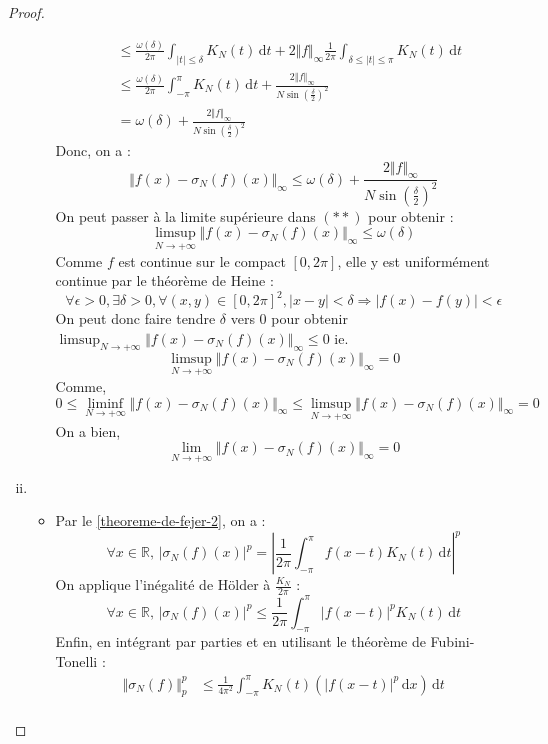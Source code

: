 \begin{proof}
\begin{enumerate}[(i)]
\begin{itemize}
\begin{align*}
					&\leq \frac{\omega(\delta)}{2\pi} \int_{\vert t \vert \leq \delta} K_N(t) \, \mathrm{d}t + 2 \Vert f \Vert_\infty \frac{1}{2\pi} \int_{\delta \leq \vert t \vert \leq \pi} K_N(t) \, \mathrm{d}t \\
					&\leq \frac{\omega(\delta)}{2\pi} \int_{-\pi}^{\pi} K_N(t) \, \mathrm{d}t + \frac{2 \Vert f \Vert_\infty}{N \sin \left(\frac{\delta}{2} \right)^2} \\
					&= \omega(\delta) + \frac{2 \Vert f \Vert_\infty}{N \sin \left(\frac{\delta}{2} \right)^2}
				\end{align*}
				Donc, on a :
				\[ \Vert f(x) - \sigma_N(f)(x) \Vert_\infty \leq \omega(\delta) + \frac{2 \Vert f \Vert_\infty}{N \sin \left(\frac{\delta}{2} \right)^2} \tag{**} \]
				On peut passer à la limite supérieure dans $(**)$ pour obtenir :
				\[ \limsup_{N \rightarrow +\infty} \Vert f(x) - \sigma_N(f)(x) \Vert_\infty \leq \omega(\delta) \]
				Comme $f$ est continue sur le compact $[0,2\pi]$, elle y est uniformément continue par le théorème de Heine :
				\[ \forall \epsilon>0, \exists \delta>0, \forall(x,y)\in[0,2\pi]^2, |x-y|<\delta\Rightarrow |f(x)-f(y)|<\epsilon \]
				On peut donc faire tendre $\delta$ vers $0$ pour obtenir $\limsup_{N \rightarrow +\infty} \Vert f(x) - \sigma_N(f)(x) \Vert_\infty \leq 0$
				ie.
				\[ \limsup_{N \rightarrow +\infty} \Vert f(x) - \sigma_N(f)(x) \Vert_\infty = 0 \]
				Comme,
				\[ 0 \leq \liminf_{N \rightarrow +\infty} \Vert f(x) - \sigma_N(f)(x) \Vert_\infty \leq \limsup_{N \rightarrow +\infty} \Vert f(x) - \sigma_N(f)(x) \Vert_\infty = 0 \]
				On a bien,
				\[ \lim_{N \rightarrow +\infty} \Vert f(x) - \sigma_N(f)(x) \Vert_\infty = 0 \]
			\end{itemize}
			\item \begin{itemize}
				\item Par le \cref{theoreme-de-fejer-2}, on a :
				\[ \forall x \in \mathbb{R}, \, \vert \sigma_N(f)(x) \vert^p = \left \vert \frac{1}{2\pi} \int_{-\pi}^{\pi} f(x-t) K_N(t) \, \mathrm{d}t \right \vert^p \]
				On applique l'inégalité de Hölder à $\frac{K_N}{2\pi}$ :
				\[ \forall x \in \mathbb{R}, \, \vert \sigma_N(f)(x) \vert^p \leq \frac{1}{2\pi} \int_{-\pi}^{\pi} \vert f(x-t) \vert^p K_N(t) \, \mathrm{d}t \]
				Enfin, en intégrant par parties et en utilisant le théorème de Fubini-Tonelli :
				\begin{align*}
					\Vert \sigma_N(f) \Vert_p^p &\leq \frac{1}{4\pi^2} \int_{-\pi}^{\pi} K_N(t) \left( \vert f(x-t) \vert^p \, \mathrm{d}x \right) \, \mathrm{d}t \\

\end{align*}
\end{itemize}
\end{enumerate}
\end{proof}
